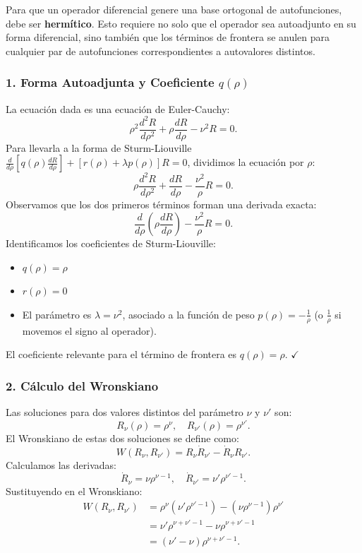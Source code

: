 \documentclass[a4paper]{article}
\begin{document}
Para que un operador diferencial genere una base ortogonal de autofunciones, debe ser \textbf{hermítico}. Esto requiere no solo que el operador sea autoadjunto en su forma diferencial, sino también que los términos de frontera se anulen para cualquier par de autofunciones correspondientes a autovalores distintos.

\subsubsection{1. Forma Autoadjunta y Coeficiente $q(\rho)$}

La ecuación dada es una ecuación de Euler-Cauchy:
$$
\rho^2 \frac{d^2R}{d\rho^2} + \rho \frac{dR}{d\rho} - \nu^2 R = 0.
$$
Para llevarla a la forma de Sturm-Liouville $\frac{d}{d\rho}\left[q(\rho) \frac{dR}{d\rho}\right] + \left[r(\rho) + \lambda p(\rho)\right]R = 0$, dividimos la ecuación por $\rho$:
$$
\rho \frac{d^2R}{d\rho^2} + \frac{dR}{d\rho} - \frac{\nu^2}{\rho} R = 0.
$$
Observamos que los dos primeros términos forman una derivada exacta:
$$
\frac{d}{d\rho}\left(\rho \frac{dR}{d\rho}\right) - \frac{\nu^2}{\rho} R = 0.
$$
Identificamos los coeficientes de Sturm-Liouville:
\begin{itemize}
    \item $q(\rho) = \rho$
    \item $r(\rho) = 0$
    \item El parámetro es $\lambda = \nu^2$, asociado a la función de peso $p(\rho) = -\frac{1}{\rho}$ (o $\frac{1}{\rho}$ si movemos el signo al operador).
\end{itemize}
El coeficiente relevante para el término de frontera es $q(\rho) = \rho$. $\checkmark$

\subsubsection{2. Cálculo del Wronskiano}

Las soluciones para dos valores distintos del parámetro $\nu$ y $\nu'$ son:
$$
R_\nu(\rho) = \rho^\nu, \quad R_{\nu'}(\rho) = \rho^{\nu'}.
$$
El Wronskiano de estas dos soluciones se define como:
$$
W(R_\nu, R_{\nu'}) = R_\nu \dot{R}_{\nu'} - \dot{R}_\nu R_{\nu'}.
$$
Calculamos las derivadas:
$$
\dot{R}_\nu = \nu \rho^{\nu-1}, \quad \dot{R}_{\nu'} = \nu' \rho^{\nu'-1}.
$$
Sustituyendo en el Wronskiano:
\begin{align}
W(R_\nu, R_{\nu'}) &= \rho^\nu (\nu' \rho^{\nu'-1}) - (\nu \rho^{\nu-1}) \rho^{\nu'} \nonumber \\
&= \nu' \rho^{\nu+\nu'-1} - \nu \rho^{\nu+\nu'-1} \nonumber \\
&= (\nu' - \nu) \rho^{\nu+\nu'-1}.
\end{align}
\end{document}
